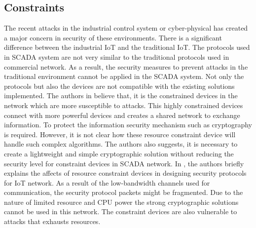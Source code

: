\documentclass[letterpaper, 10 pt, conference]{ieeeconf}  %
\begin{document}
\subsection{Constraints}
The recent attacks in the industrial control system or cyber-physical has created a major concern in security of these environments. There is a significant difference between the industrial IoT and the traditional IoT. The protocols used in SCADA system are not very similar to the traditional protocols used in commercial network. As a result, the security measures to prevent attacks in the traditional environment cannot be applied in the SCADA system. Not only the protocols but also the devices are not compatible with the existing solutions implemented. The authors in \cite{c19} believe that, it is the constrained devices in the network which are more susceptible to attacks. This highly constrained devices connect with more powerful devices and creates a shared network to exchange information. To protect the information security mechanism such as cryptography is required. However, it is not clear how these resource constraint device will handle such complex algorithms. The authors also suggests, it is necessary to create a lightweight and simple cryptographic solution without reducing the security level for constraint devices in SCADA network.
In \cite{c20}, the authors briefly explains the affects of resource constraint devices in designing security protocols for IoT network. As a result of the low-bandwidth channels used for communication, the security protocol packets might be fragmented. Due to the nature of limited resource and CPU power the strong cryptographic solutions cannot be used in this network. The constraint devices are also vulnerable to attacks that exhausts resources. 
\end{document}
